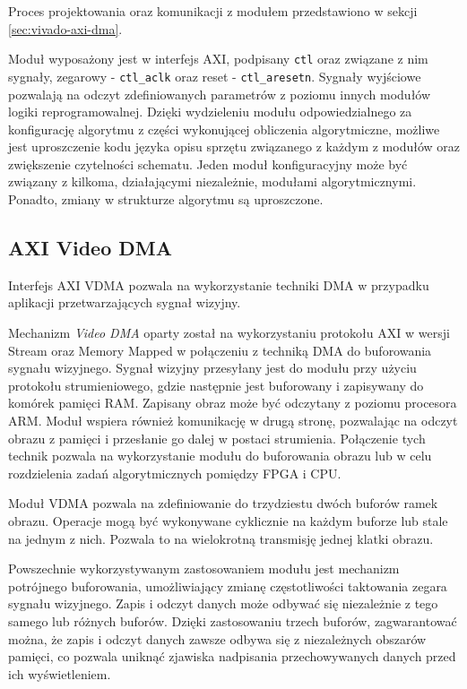 Proces projektowania oraz komunikacji z modułem przedstawiono w sekcji \ref{sec:vivado-axi-dma}.

Moduł wyposażony jest w interfejs AXI, podpisany \texttt{ctl} oraz związane z nim sygnały, zegarowy - \texttt{ctl\_aclk} oraz reset - \texttt{ctl\_aresetn}. Sygnały wyjściowe pozwalają na odczyt zdefiniowanych parametrów z poziomu innych modułów logiki reprogramowalnej. Dzięki wydzieleniu modułu odpowiedzialnego za konfigurację algorytmu z części wykonującej obliczenia algorytmiczne, możliwe jest uproszczenie kodu języka opisu sprzętu związanego z każdym z modułów oraz zwiększenie czytelności schematu. Jeden moduł konfiguracyjny może być związany z kilkoma, działającymi niezależnie, modułami algorytmicznymi. Ponadto, zmiany w strukturze algorytmu są uproszczone.


\subsection{AXI Video DMA}
\label{sec:axi-vdma}
Interfejs AXI VDMA pozwala na wykorzystanie techniki DMA w przypadku aplikacji przetwarzających sygnał wizyjny.

Mechanizm \emph{Video DMA} oparty został na wykorzystaniu protokołu AXI w wersji Stream oraz Memory Mapped w połączeniu z techniką DMA do buforowania sygnału wizyjnego. 
Sygnał wizyjny przesyłany jest do modułu przy użyciu protokołu strumieniowego, gdzie następnie jest buforowany i zapisywany do komórek pamięci RAM. Zapisany obraz może być odczytany z poziomu procesora ARM. Moduł wspiera również komunikację w drugą stronę, pozwalając na odczyt obrazu z pamięci i przesłanie go dalej w postaci strumienia. Połączenie tych technik pozwala na wykorzystanie modułu do buforowania obrazu lub w celu rozdzielenia zadań algorytmicznych pomiędzy FPGA i CPU.

Moduł VDMA pozwala na zdefiniowanie do trzydziestu dwóch buforów ramek obrazu. Operacje mogą być wykonywane cyklicznie na każdym buforze lub stale na jednym z nich. Pozwala to na wielokrotną transmisję jednej klatki obrazu.

Powszechnie wykorzystywanym zastosowaniem modułu jest mechanizm potrójnego buforowania, umożliwiający zmianę częstotliwości taktowania zegara sygnału wizyjnego. Zapis i odczyt danych może odbywać się niezależnie z tego samego lub różnych buforów. Dzięki zastosowaniu trzech buforów, zagwarantować można, że zapis i odczyt danych zawsze odbywa się z niezależnych obszarów pamięci, co pozwala uniknąć zjawiska nadpisania przechowywanych danych przed ich wyświetleniem.

